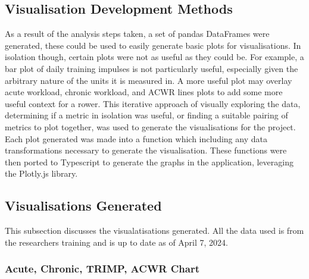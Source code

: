 \subsection{Visualisation Development Methods}
As a result of the analysis steps taken, a set of pandas DataFrames were generated, these could be used to easily generate basic plots for visualisations. In isolation though, certain plots were not as useful as they could be. For example, a bar plot of daily training impulses is not particularly useful, especially given the arbitrary nature of the units it is measured in. A more useful plot may overlay acute workload, chronic workload, and ACWR lines plots to add some more useful context for a rower. This iterative approach of visually exploring the data, determining if a metric in isolation was useful, or finding a suitable pairing of metrics to plot together, was used to generate the visualisations for the project. Each plot generated was made into a function which including any data transformations necessary to generate the visualisation. These functions were then ported to Typescript to generate the graphs in the application, leveraging the Plotly.js library.

\subsection{Visualisations Generated}
This subsection discusses the visualatisations generated. All the data used is from the researchers training and is up to date as of April 7, 2024.

\subsubsection{Acute, Chronic, TRIMP, ACWR Chart}

